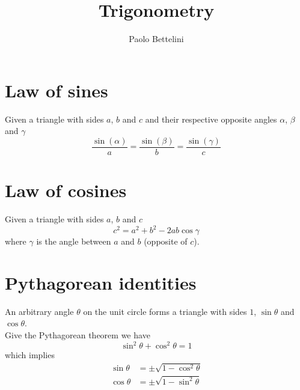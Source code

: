 \documentclass{article}
\title{Trigonometry}
\author{Paolo Bettelini}
\date{}
\begin{document}
\maketitle
\tableofcontents
\pagebreak

\section{Law of sines}

Given a triangle with sides \(a\), \(b\) and \(c\) and their respective opposite angles
\(\alpha\), \(\beta\) and \(\gamma\)
\[
    \frac{\sin(\alpha)}{a} =
    \frac{\sin(\beta)}{b} =
    \frac{\sin(\gamma)}{c}
\]

\section{Law of cosines}

Given a triangle with sides \(a\), \(b\) and \(c\)
\[
    c^2 = a^2 + b^2 - 2ab\cos\gamma
\]
where \(\gamma\) is the angle between \(a\) and \(b\) (opposite of \(c\)).

\section{Pythagorean identities}

An arbitrary angle \(\theta\) on the unit circle forms a triangle with sides
\(1\), \(\sin\theta\) and \(\cos\theta\).
\\
Give the Pythagorean theorem we have
\[
    \sin^2\theta + \cos^2\theta = 1
\]
which implies
\begin{align*}
    \sin\theta &= \pm \sqrt{1 - \cos^2\theta} \\
    \cos\theta &= \pm \sqrt{1 - \sin^2\theta}
\end{align*}

\pagebreak
\end{document}
